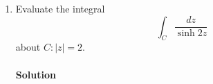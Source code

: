 \documentclass[11pt]{article}
\begin{document}
\begin{enumerate}
\begin{proof}
		Because $\cos$ is an even function, and $\sin$ is an odd function, this simplifies to $-2\cos{\pi t}$ as we set out to prove.
	\end{proof}
			
	\item Evaluate the integral
	\[ \int_C \frac{dz}{\sinh{2z}} \]
	about $C: |z| = 2$.
	
	\paragraph{Solution} 
\end{enumerate}
\end{document}
